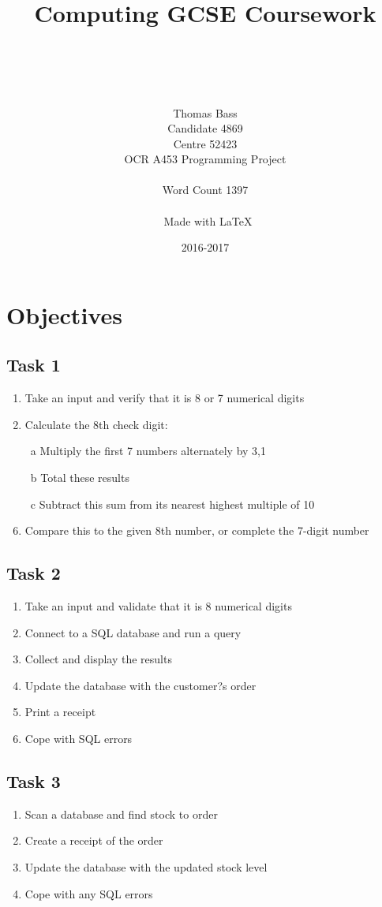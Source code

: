 \documentclass[a4paper]{article}
\title{Computing GCSE Coursework}
\author{\\ \\ \\ \\ Thomas Bass\\Candidate 4869\\Centre 52423\\OCR A453 Programming Project\\\\ Word Count 1397 \\\\\ Made with \LaTeX}
\date{2016-2017}
\begin{document}
\maketitle
\pagebreak
\renewcommand*\contentsname{Summary}
\tableofcontents
\pagebreak
\section{Objectives}

\subsection{Task 1}
\begin{enumerate}
\item{Take an input and verify that it is 8 or 7 numerical digits}
\item{Calculate the 8th check digit:}
\item[~a]{Multiply the first 7 numbers alternately by 3,1}
\item[~b]{Total these results}
\item[~c]{Subtract this sum from its nearest highest multiple of 10}
\item{Compare this to the given 8th number, or complete the 7-digit number}
\end{enumerate}

\subsection{Task 2}
\begin{enumerate}
\item{Take an input and validate that it is 8 numerical digits}
\item{Connect to a SQL database and run a query}
\item{Collect and display the results}
\item{Update the database with the customer?s order}
\item{Print a receipt}
\item{Cope with SQL errors}
\end{enumerate}

\subsection{Task 3}
\begin{enumerate}
\item{Scan a database and find stock to order}
\item{Create a receipt of the order}
\item{Update the database with the updated stock level}
\item{Cope with any SQL errors}
\end{enumerate}
\end{document}
